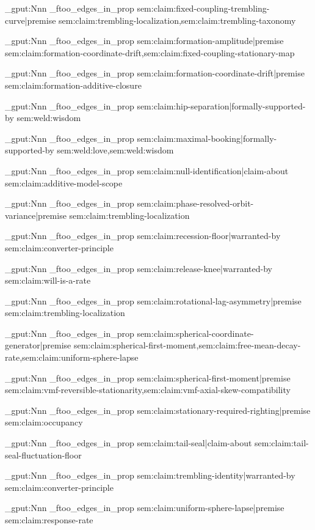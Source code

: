 \prop_gput:Nnn \g_ftoo_edges_in_prop { sem:claim:fixed-coupling-trembling-curve|premise } { sem:claim:trembling-localization,sem:claim:trembling-taxonomy }

\prop_gput:Nnn \g_ftoo_edges_in_prop { sem:claim:formation-amplitude|premise } { sem:claim:formation-coordinate-drift,sem:claim:fixed-coupling-stationary-map }

\prop_gput:Nnn \g_ftoo_edges_in_prop { sem:claim:formation-coordinate-drift|premise } { sem:claim:formation-additive-closure }

\prop_gput:Nnn \g_ftoo_edges_in_prop { sem:claim:hip-separation|formally-supported-by } { sem:weld:wisdom }

\prop_gput:Nnn \g_ftoo_edges_in_prop { sem:claim:maximal-booking|formally-supported-by } { sem:weld:love,sem:weld:wisdom }

\prop_gput:Nnn \g_ftoo_edges_in_prop { sem:claim:null-identification|claim-about } { sem:claim:additive-model-scope }

\prop_gput:Nnn \g_ftoo_edges_in_prop { sem:claim:phase-resolved-orbit-variance|premise } { sem:claim:trembling-localization }

\prop_gput:Nnn \g_ftoo_edges_in_prop { sem:claim:recession-floor|warranted-by } { sem:claim:converter-principle }

\prop_gput:Nnn \g_ftoo_edges_in_prop { sem:claim:release-knee|warranted-by } { sem:claim:will-is-a-rate }

\prop_gput:Nnn \g_ftoo_edges_in_prop { sem:claim:rotational-lag-asymmetry|premise } { sem:claim:trembling-localization }

\prop_gput:Nnn \g_ftoo_edges_in_prop { sem:claim:spherical-coordinate-generator|premise } { sem:claim:spherical-first-moment,sem:claim:free-mean-decay-rate,sem:claim:uniform-sphere-lapse }

\prop_gput:Nnn \g_ftoo_edges_in_prop { sem:claim:spherical-first-moment|premise } { sem:claim:vmf-reversible-stationarity,sem:claim:vmf-axial-skew-compatibility }

\prop_gput:Nnn \g_ftoo_edges_in_prop { sem:claim:stationary-required-righting|premise } { sem:claim:occupancy }

\prop_gput:Nnn \g_ftoo_edges_in_prop { sem:claim:tail-seal|claim-about } { sem:claim:tail-seal-fluctuation-floor }

\prop_gput:Nnn \g_ftoo_edges_in_prop { sem:claim:trembling-identity|warranted-by } { sem:claim:converter-principle }

\prop_gput:Nnn \g_ftoo_edges_in_prop { sem:claim:uniform-sphere-lapse|premise } { sem:claim:response-rate }

